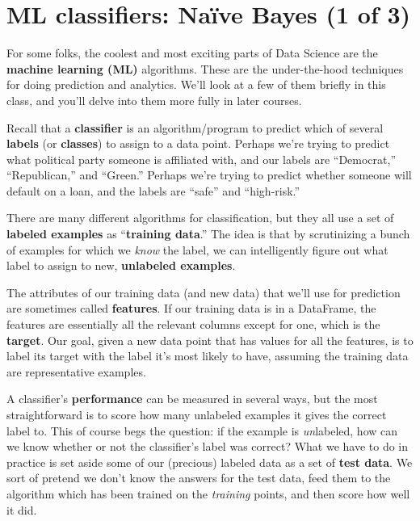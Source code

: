 \chapter[Na\"{i}ve Bayes (1 of 3)]
{\LARGE ML classifiers: Na\"{i}ve Bayes (1 of 3)}
\label{ch:naiveBayes1}


For some folks, the coolest and most exciting parts of Data Science are the
\textbf{machine learning (ML)} algorithms. These are the under-the-hood
techniques for doing prediction and analytics. We'll look at a few of them
briefly in this class, and you'll delve into them more fully in later courses.


Recall that a \textbf{classifier} is an algorithm/program to predict which of
several \textbf{labels} (or \textbf{classes}) to assign to a data point.
Perhaps we're trying to predict what political party someone is affiliated
with, and our labels are ``Democrat,'' ``Republican,'' and ``Green.'' Perhaps
we're trying to predict whether someone will default on a loan, and the labels
are ``safe'' and ``high-risk.''


There are many different algorithms for classification, but they all use a set
of \textbf{labeled examples} as ``\textbf{training data}.'' The idea is that by
scrutinizing a bunch of examples for which we \textit{know} the label, we can
intelligently figure out what label to assign to new, \textbf{unlabeled
examples}.


The attributes of our training data (and new data) that we'll use for
prediction are sometimes called \textbf{features}. If our training data is in
a DataFrame, the features are essentially all the relevant columns except for
one, which is the \textbf{target}. Our goal, given a new data point that has
values for all the features, is to label its target with the label it's most
likely to have, assuming the training data are representative examples. 


A classifier's \textbf{performance} can be measured in several ways, but the
most straightforward is to score how many unlabeled examples it gives the
correct label to. This of course begs the question: if the example is
\textit{un}labeled, how can we know whether or not the classifier's label was
correct? What we have to do in practice is set aside some of our (precious)
labeled data as a set of \textbf{test data}. We sort of pretend we don't know
the answers for the test data, feed them to the algorithm which has been
trained on the \textit{training} points, and then score how well it did.

